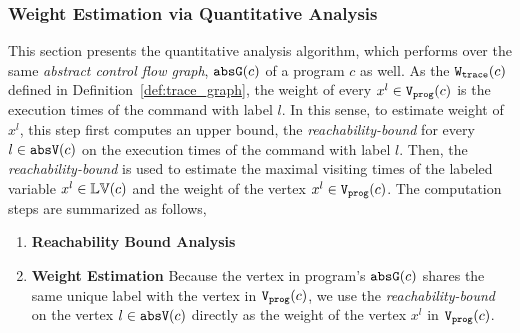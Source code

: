 \subsubsection{Weight Estimation via Quantitative Analysis}
\label{sec:alg_weightgen}
%
This section presents the quantitative analysis algorithm, which performs over the same \emph{abstract control flow graph}, $\mathtt{abs}{\mathtt{G}}(c)$ of a program $c$ as well. 
As the $\mathtt{{W_{trace}}}(c)$ defined in Definition~\ref{def:trace_graph}, the weight of every $x^l \in \mathtt{{V_{prog}}}(c)$ is
the execution times of the command with label $l$. 
In this sense, to estimate weight of $x^l$, this step first computes an upper bound, the \emph{reachability-bound}\cite{GulwaniZ10} for every $l \in \mathtt{abs}{\mathtt{V}}(c)$
on the execution times of the command with label $l$. 
Then,
the \emph{reachability-bound} is used to estimate the maximal visiting times of the labeled variable $x^l \in \mathbb{LV}(c)$
and 
the weight of the vertex $x^l \in \mathtt{{V_{prog}}}(c)$.
The computation steps are summarized as follows,
\begin{enumerate}
  \item \textbf{Reachability Bound Analysis}

    \item \textbf{Weight Estimation}
    Because
    the vertex in program's $\mathtt{abs}{\mathtt{G}}(c)$ shares the same unique label with the vertex in $\mathtt{{V_{prog}}}(c)$, 
    we use the \emph{reachability-bound} on the vertex $l \in \mathtt{abs}{\mathtt{V}}(c)$ directly as the weight of the vertex $x^l$ in $\mathtt{{V_{prog}}}(c)$.
\end{enumerate}

